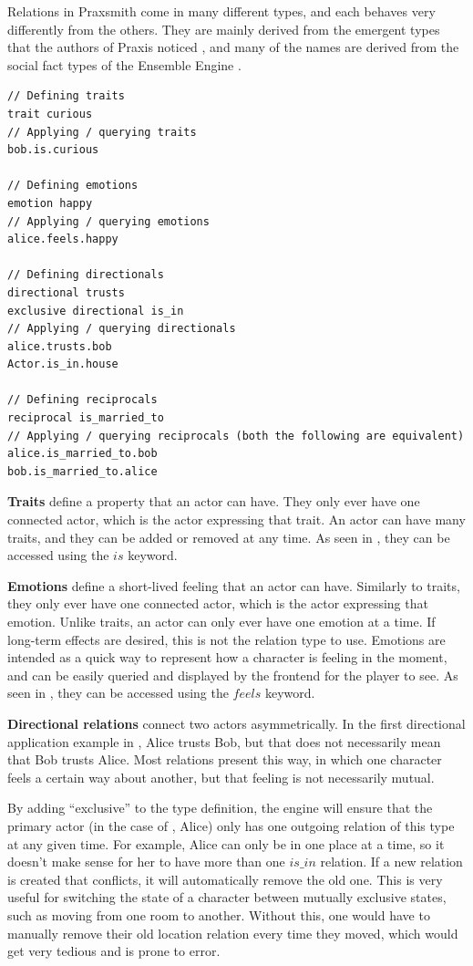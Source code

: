Relations in Praxsmith come in many different types, and each behaves very differently
from the others. They are mainly derived from the emergent types that the authors of Praxis
noticed \cite{evans_ai_2015}, and many of the names are derived from the social fact
types of the Ensemble Engine \cite{samuel_ensemble_2015}.

\begin{lstlisting}[float=hb, caption=Examples of how to instantiate the simple relation types., label=lst:RelationTypeExamples]
// Defining traits
trait curious
// Applying / querying traits
bob.is.curious

// Defining emotions
emotion happy
// Applying / querying emotions
alice.feels.happy

// Defining directionals
directional trusts
exclusive directional is_in
// Applying / querying directionals
alice.trusts.bob
Actor.is_in.house

// Defining reciprocals
reciprocal is_married_to
// Applying / querying reciprocals (both the following are equivalent)
alice.is_married_to.bob
bob.is_married_to.alice
\end{lstlisting}

\textbf{Traits} define a property that an actor can have. They only ever have one connected
actor, which is the actor expressing that trait. An actor can have many traits,
and they can be added or removed at any time. As seen in ,
they can be accessed using the $is$ keyword.

\textbf{Emotions} define a short-lived feeling that an actor can have. Similarly to traits, they
only ever have one connected actor, which is the actor expressing that emotion.
Unlike traits, an actor can only ever have one emotion at a time. If long-term effects
are desired, this is not the relation type to use. Emotions are intended as a quick
way to represent how a character is feeling in the moment, and can be easily queried
and displayed by the frontend for the player to see. As seen in ,
they can be accessed using the $feels$ keyword.

\textbf{Directional relations} connect two actors asymmetrically. In the first
directional application example in , Alice
trusts Bob, but that does not necessarily mean that Bob trusts Alice. Most relations
present this way, in which one character feels a certain way about another, but that
feeling is not necessarily mutual.

By adding ``exclusive'' to the type definition, the engine will ensure that the primary actor
(in the case of , Alice) only has one outgoing
relation of this type at any given time. For example, Alice can only be in one
place at a time, so it doesn't make sense for her to have more than one $is\_in$ relation.
If a new relation is created that conflicts, it will automatically remove the old one.
This is very useful for switching the state of a character between mutually exclusive states,
such as moving from one room to another. Without this, one would have to manually
remove their old location relation every time they moved, which would get very
tedious and is prone to error.

